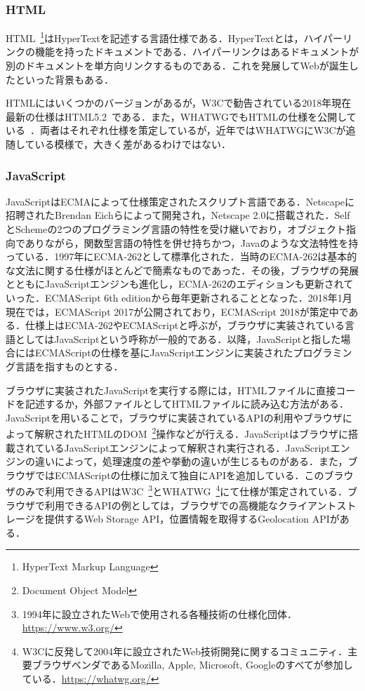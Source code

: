 \subsubsection{HTML}
HTML~\footnote{HyperText Markup Language}はHyperTextを記述する言語仕様である．HyperTextとは，ハイパーリンクの機能を持ったドキュメントである．ハイパーリンクはあるドキュメントが別のドキュメントを単方向リンクするものである．これを発展してWebが誕生したといった背景もある．

HTMLにはいくつかのバージョンがあるが，W3Cで勧告されている2018年現在最新の仕様はHTML5.2~\cite{html5_2}である．また，WHATWGでもHTMLの仕様を公開している~\cite{html_ls}．両者はそれぞれ仕様を策定しているが，近年ではWHATWGにW3Cが追随している模様で，大きく差があるわけではない．
\subsubsection{JavaScript}
JavaScriptはECMAによって仕様策定されたスクリプト言語である．Netscapeに招聘されたBrendan Eichらによって開発され，Netscape 2.0に搭載された．SelfとSchemeの2つのプログラミング言語の特性を受け継いでおり，オブジェクト指向でありながら，関数型言語の特性を併せ持ちかつ，Javaのような文法特性を持っている．1997年にECMA-262として標準化された．当時のECMA-262は基本的な文法に関する仕様がほとんどで簡素なものであった．その後，ブラウザの発展とともにJavaScriptエンジンも進化し，ECMA-262のエディションも更新されていった．ECMAScript 6th editionから毎年更新されることとなった．2018年1月現在では，ECMAScript 2017が公開されており，ECMAScript 2018が策定中である．仕様上はECMA-262やECMAScriptと呼ぶが，ブラウザに実装されている言語としてはJavaScriptという呼称が一般的である．以降，JavaScriptと指した場合にはECMAScriptの仕様を基にJavaScriptエンジンに実装されたプログラミング言語を指すものとする．

ブラウザに実装されたJavaScriptを実行する際には，HTMLファイルに直接コードを記述するか，外部ファイルとしてHTMLファイルに読み込む方法がある．JavaScriptを用いることで，ブラウザに実装されているAPIの利用やブラウザによって解釈されたHTMLのDOM~\footnote{Document Object Model}操作などが行える．JavaScriptはブラウザに搭載されているJavaScriptエンジンによって解釈され実行される．JavaScriptエンジンの違いによって，処理速度の差や挙動の違いが生じるものがある．また，ブラウザではECMAScriptの仕様に加えて独自にAPIを追加している．このブラウザのみで利用できるAPIはW3C~\footnote{1994年に設立されたWebで使用される各種技術の仕様化団体．\url{https://www.w3.org/}}とWHATWG~\footnote{W3Cに反発して2004年に設立されたWeb技術開発に関するコミュニティ．主要ブラウザベンダであるMozilla, Apple, Microsoft, Googleのすべてが参加している．\url{https://whatwg.org/}}にて仕様が策定されている．ブラウザで利用できるAPIの例としては，ブラウザでの高機能なクライアントストレージを提供するWeb Storage API，位置情報を取得するGeolocation APIがある．
